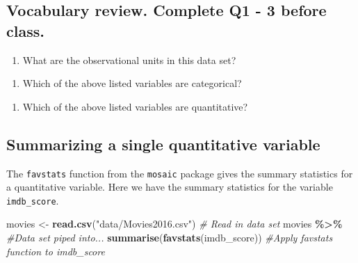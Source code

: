 \documentclass[
]{report}
\newenvironment{Shaded}{\begin{snugshade}}{\end{snugshade}}
\newcommand{\CommentTok}[1]{\textcolor[rgb]{0.56,0.35,0.01}{\textit{#1}}}
\newcommand{\KeywordTok}[1]{\textcolor[rgb]{0.13,0.29,0.53}{\textbf{#1}}}
\newcommand{\NormalTok}[1]{#1}
\newcommand{\OperatorTok}[1]{\textcolor[rgb]{0.81,0.36,0.00}{\textbf{#1}}}
\newcommand{\StringTok}[1]{\textcolor[rgb]{0.31,0.60,0.02}{#1}}
\providecommand{\tightlist}{%
  \setlength{\itemsep}{0pt}\setlength{\parskip}{0pt}}
\begin{document}
\newpage

\hypertarget{vocabulary-review.-complete-q1---3-before-class.}{%
\subsection*{Vocabulary review. Complete Q1 - 3 before class.}\label{vocabulary-review.-complete-q1---3-before-class.}}

\begin{enumerate}
\def\labelenumi{\arabic{enumi}.}
\tightlist
\item
  What are the observational units in this data set?
\end{enumerate}

\vspace{0.1in}

\begin{enumerate}
\def\labelenumi{\arabic{enumi}.}
\setcounter{enumi}{1}
\tightlist
\item
  Which of the above listed variables are categorical?
\end{enumerate}

\vspace{.5in}

\begin{enumerate}
\def\labelenumi{\arabic{enumi}.}
\setcounter{enumi}{2}
\tightlist
\item
  Which of the above listed variables are quantitative?
\end{enumerate}

\vspace{.5in}

\hypertarget{summarizing-a-single-quantitative-variable}{%
\subsection*{Summarizing a single quantitative variable}\label{summarizing-a-single-quantitative-variable}}

The \texttt{favstats} function from the \texttt{mosaic} package gives the summary statistics for a quantitative variable. Here we have the summary statistics for the variable \texttt{imdb\_score}.

\begin{Shaded}
\begin{Highlighting}[]
\NormalTok{movies \textless{}{-}}\StringTok{ }\KeywordTok{read.csv}\NormalTok{(}\StringTok{"data/Movies2016.csv"}\NormalTok{) }\CommentTok{\# Read in data set}
\NormalTok{movies }\OperatorTok{\%\textgreater{}\%}\StringTok{ }\CommentTok{\#Data set piped into...}
\StringTok{  }\KeywordTok{summarise}\NormalTok{(}\KeywordTok{favstats}\NormalTok{(imdb\_score)) }\CommentTok{\#Apply favstats function to imdb\_score}
\end{Highlighting}
\end{Shaded}
\end{document}
